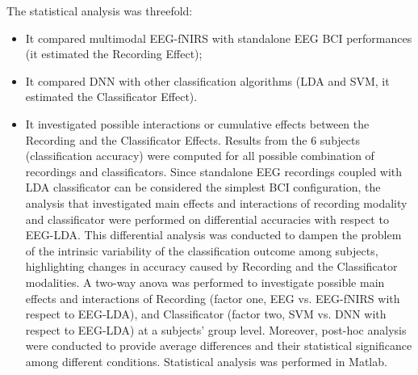 \documentclass[12pt ]{iopart}
\begin{document}
The statistical analysis was threefold:
\begin{itemize}
\item It compared multimodal EEG-fNIRS with standalone EEG  BCI performances (it estimated the Recording Effect);
\item It compared DNN with other classification  algorithms (LDA and SVM, it estimated the Classificator Effect).
\item It investigated possible interactions or cumulative effects between the Recording and the Classificator Effects.
Results from the 6 subjects (classification accuracy) were computed for all possible combination of recordings and classificators. 
Since standalone EEG recordings coupled with LDA classificator can be considered the simplest BCI configuration, the analysis that investigated main effects and interactions of recording modality and classificator were performed on differential accuracies with respect to EEG-LDA.
This differential analysis was conducted to dampen the problem of the intrinsic variability of  the classification outcome among subjects, highlighting changes in accuracy caused by  Recording and the Classificator modalities.
A two-way anova was performed to investigate possible main effects and interactions of Recording  (factor one, EEG vs. EEG-fNIRS with respect to EEG-LDA), and  Classificator (factor two, SVM vs. DNN with respect to EEG-LDA) at a subjects' group level.
Moreover, post-hoc analysis were conducted to provide average differences and their statistical significance among different conditions.
Statistical analysis was performed in Matlab.
\end{itemize} 
\end{document}
